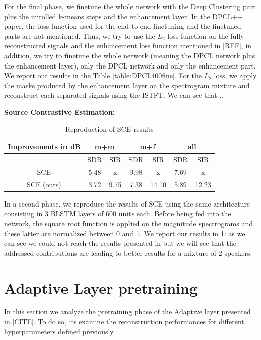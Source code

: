 \documentclass[master, tikz, final,11pt, dvipdfmx]{iscs-thesis}
\begin{document}
For the final phase, we finetune the whole network with the Deep Clustering part plus the unrolled k-means steps and the enhancement layer. In the DPCL++ paper, the loss function used for the end-to-end finetuning and the finetuned parts are not mentioned. Thus, we try to use the $L_2$ loss function on the fully reconstructed signals and the enhancement loss function mentioned in [REF], in addition, we try to finetune the whole network (meaning the DPCL network plus the enhancement layer), only the DPCL network and only the enhancement part. We report our results in the Table \ref{table:DPCL400fine}. For the $L_2$ loss, we apply the masks produced by the enhancement layer on the spectrogram mixture and reconstruct each separated signals using the ISTFT. We can see that ..

\textbf{Source Contrastive Estimation:} 

\begin{table}[ht]
\centering
\begin{tabular}{c|c|c|c|c|c|c}
Improvements in dB & \multicolumn{2}{c|}{m+m} & \multicolumn{2}{c|}{m+f} & \multicolumn{2}{c}{all} \\ 
\hline 
 & SDR & SIR & SDR & SIR & SDR & SIR \\ 
\hline 
SCE \cite{SCE} & 5.48 & x & 9.98 & x & 7.69 & x \\ 
SCE (ours) & 3.72 & 9.75 & 7.38 & 14.10 & 5.89 & 12.23 \\ 
\end{tabular}
\caption{Reproduction of SCE results}
\label{table:SCErepro}
\end{table}

In a second phase, we reproduce the results of SCE \cite{SCE} using the same architecture consisting in 3 BLSTM layers of 600 units each. Before being fed into the network, the square root function is applied on the magnitude spectrograms and these latter are normalized between 0 and 1. We report our results in \ref{table:SCErepro}: as we can see we could not reach the results presented in \cite{SCE} but we will see that the addressed contributions are leading to better results for a mixture of 2 speakers.


\section{Adaptive Layer pretraining}

In this section we analyze the pretraining phase of the Adaptive layer presented in [CITE]. To do so, its examine the reconstruction performances for different hyperparameters defined previously.
\end{document}
